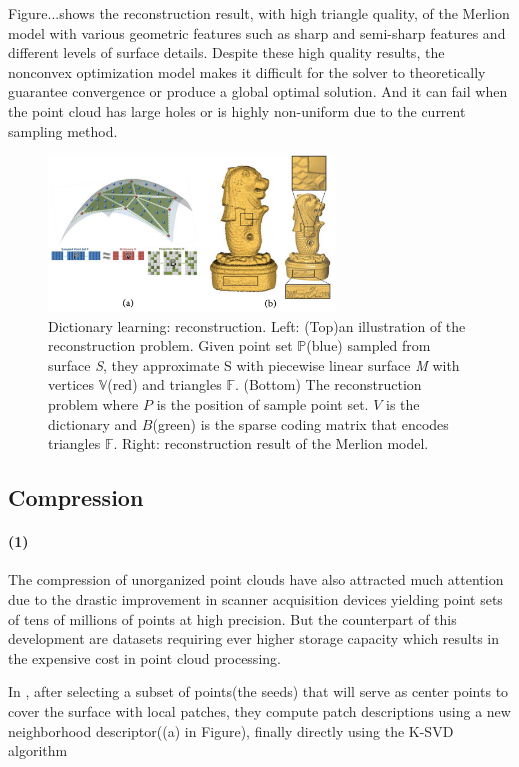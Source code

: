 Figure...shows the reconstruction result, with high triangle quality, of the Merlion model with various geometric features such as sharp and semi-sharp features and different levels of surface details. Despite these high quality results, the nonconvex optimization model makes it difficult for the solver to theoretically guarantee convergence or produce a global optimal solution. And it can fail when the point cloud has large holes or is highly non-uniform due to the current sampling method.

\begin{figure}[ht]
  \centering
  \includegraphics[width=3in]{images/reconstruction_learning}
  \caption{Dictionary learning: reconstruction\cite{xiong2014robust}. Left: (Top)an illustration of the reconstruction problem. Given point set $\mathbb{P}$(blue) sampled from surface \textsl{S}, they approximate S with piecewise linear surface \textsl{M} with vertices $\mathbb{V}$(red) and triangles $\mathbb{F}$. (Bottom) The reconstruction problem where $P$ is the position of sample point set. $V$ is the dictionary and $B$(green) is the sparse coding matrix that encodes triangles $\mathbb{F}$. Right: reconstruction result of the Merlion model.}
\end{figure}


\subsection{Compression}
\label{subsec:compression}

\paragraph{(1)}The compression of unorganized point clouds have also attracted much attention due to the drastic improvement in scanner acquisition devices yielding point sets of tens of millions of points at high precision. But the counterpart of this development are datasets requiring ever higher storage capacity which results in the expensive cost in point cloud processing.

In \cite{digne2014self}, after selecting a subset of points(the seeds) that will serve as center points to cover the surface with local patches,
they compute patch descriptions using a new neighborhood descriptor((a) in Figure),
finally directly using the K-SVD algorithm \cite{aharon2006svd}

